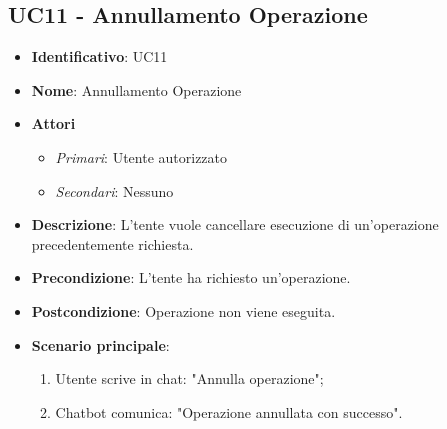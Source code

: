 \subsection{UC11 - Annullamento Operazione }
\begin{itemize}
	\item \textbf{Identificativo}: UC11
	\item \textbf{Nome}: Annullamento Operazione
	\item \textbf{Attori}
	\begin{itemize} 
		\item \textit{Primari}: Utente autorizzato
		\item \textit{Secondari}: Nessuno
	\end{itemize}
	\item \textbf{Descrizione}: L'tente vuole cancellare esecuzione di un'operazione precedentemente richiesta.
	\item \textbf{Precondizione}: L'tente ha richiesto un'operazione.
	\item \textbf{Postcondizione}: Operazione non viene eseguita.
	\item \textbf{Scenario principale}: \begin{enumerate}
		\item Utente scrive in chat: "Annulla operazione";
		\item Chatbot comunica: "Operazione annullata con successo".
	\end{enumerate}
\end{itemize}